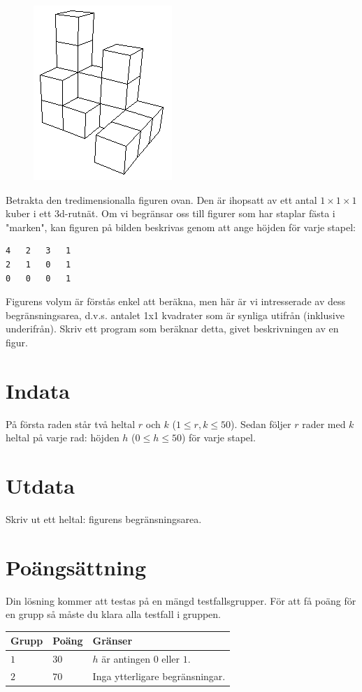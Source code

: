 
\begin{figure}
\centering
\includegraphics{area}
\end{figure}

Betrakta den tredimensionalla figuren ovan. Den är ihopsatt av ett antal $1 \times 1 \times 1$ kuber i ett 3d-rutnät. Om vi begränsar oss till figurer som har staplar fästa i "marken", kan figuren på bilden beskrivas genom att ange höjden för varje stapel: 

\begin{verbatim}
4	2	3	1
2	1	0	1
0	0	0	1
\end{verbatim}

Figurens volym är förstås enkel att beräkna, men här är vi intresserade av dess begränsningsarea, d.v.s. antalet 1x1 kvadrater som är synliga utifrån (inklusive underifrån). Skriv ett program som beräknar detta, givet beskrivningen av en figur. 

\section*{Indata}
På första raden står två heltal $r$ och $k$ ($1 \le r, k \le 50$). Sedan följer $r$ rader med $k$ heltal på varje rad:
höjden $h$ ($0 \leq h \leq 50$) för varje stapel.

\section*{Utdata}
Skriv ut ett heltal: figurens begränsningsarea.

\section*{Poängsättning}
Din lösning kommer att testas på en mängd testfallsgrupper.
För att få poäng för en grupp så måste du klara alla testfall i gruppen.


\noindent
\begin{tabular}{| l | l | p{12cm} |}
  \hline
  \textbf{Grupp} & \textbf{Poäng} & \textbf{Gränser} \\ \hline
  $1$    & $30$       & $h$ är antingen $0$ eller $1$. \\ \hline
  $2$    & $70$       & Inga ytterligare begränsningar. \\ \hline
\end{tabular}
